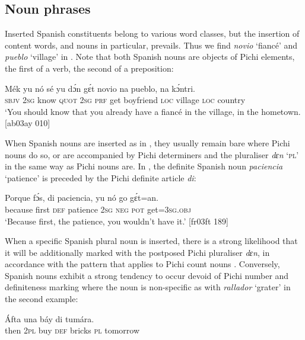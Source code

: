 \subsection{Noun phrases}\label{sec:13.2.1}

Inserted Spanish constituents belong to various word classes, but the insertion of content words, and nouns in particular, prevails. Thus we find \textit{novio} ‘fiancé’ and \textit{pueblo} ‘village’\textit{} in . Note that both Spanish nouns are objects of Pichi elements, the first of a verb, the second of a preposition: 


\ea%
    \label{ex:key:1696}
    \gll Mék    yu  nó    sé    yu  dɔ́n  gɛ́t  novio    na  pueblo,
na  kɔ́ntri.\\
\textsc{sbjv}    \textsc{2sg}  know  \textsc{quot}    \textsc{2sg}  \textsc{prf}  get  boyfriend  \textsc{loc}  village
\textsc{loc}  country\\
\glt ‘You should know that you already have a fiancé in the village, 
in the hometown. [ab03ay 010]
\z

When Spanish nouns are inserted as in , they usually remain bare where Pichi nouns do so, or are accompanied by Pichi determiners and the pluraliser \textit{dɛn} ‘\textsc{pl’} in the same way as Pichi nouns are. In , the definite Spanish noun \textit{paciencia} ‘patience’ is preceded by the Pichi definite article \textit{di}: 


\ea%
    \label{ex:key:1697}
    \gll Porque  fɔ́s,    di  paciencia,  yu  nó  go  gɛ́t=an.\\
because  first    \textsc{def}  patience    \textsc{2sg}  \textsc{neg}  \textsc{pot}  get=\textsc{3sg.obj}\\

\glt ‘Because first, the patience, you wouldn’t have it.’ [fr03ft 189]
\z

When a specific Spanish plural noun is inserted, there is a strong likelihood that it will be additionally marked with the postposed Pichi pluraliser \textit{dɛn}, in accordance with the pattern that applies to Pichi count nouns . Conversely, Spanish nouns exhibit a strong tendency to occur devoid of Pichi number and definiteness marking where the noun is non-specific as with \textit{rallador} ‘grater’ in the second example:


\ea%
    \label{ex:key:1698}
    \gll \'{A}fta    una  báy  di      tumára.\\
then  \textsc{2pl}  buy  \textsc{def}  bricks  \textsc{pl}  tomorrow\\

